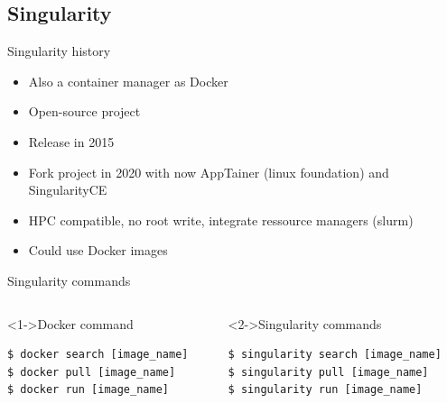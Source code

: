 \subsection{Singularity}
\begin{frame}[<+->]{Singularity history}
\begin{itemize}
\item Also a container manager as Docker
\item Open-source project
\item Release in 2015
\item Fork project in 2020 with now AppTainer (linux foundation) and SingularityCE
\item HPC compatible, no root write, integrate ressource managers (slurm)
\item Could use Docker images
\end{itemize}
\end{frame}

\begin{frame}[fragile]{Singularity commands}
\begin{columns}
\begin{column}{0.45\textwidth}
\begin{block}<1->{Docker command}
\begin{verbatim}
$ docker search [image_name]
$ docker pull [image_name]
$ docker run [image_name]
\end{verbatim}
\end{block}
\end{column}
\begin{column}{0.45\textwidth}
\begin{block}<2->{Singularity commands}
\begin{verbatim}
$ singularity search [image_name]
$ singularity pull [image_name]
$ singularity run [image_name]
\end{verbatim}
\end{block}
\end{column}
\end{columns}
\end{frame}

